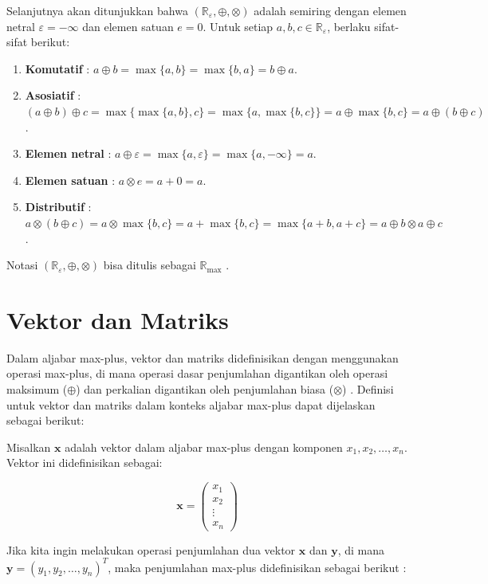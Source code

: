 \documentclass{file/TA-ITS}
\theoremstyle{definition}
\theoremstyle{definition}
\theoremstyle{plain}
\newcommand{\Real}{\mathbb{R}}
\begin{document}
Selanjutnya akan ditunjukkan bahwa $\left(\Real_\varepsilon,\oplus,\otimes\right)$ adalah semiring dengan elemen netral $\varepsilon=-\infty$ dan elemen satuan $e=0$. Untuk setiap $a,b,c\in\Real_\varepsilon$, berlaku sifat-sifat berikut:
\begin{enumerate}
    \item \textbf{Komutatif} : $a\oplus b=\max\{a,b\}=\max\{b,a\}=b\oplus a$.
    \item \textbf{Asosiatif} : $(a\oplus b)\oplus c=\max\{\max\{a,b\},c\}=\max\{a,\max\{b,c\}\}=a\oplus\max\{b,c\}=a\oplus(b\oplus c)$.
    \item \textbf{Elemen netral} : $a\oplus\varepsilon=\max\{a,\varepsilon\}=\max\{a,-\infty\}=a$.
    \item \textbf{Elemen satuan} : $a\otimes e=a+0=a$.
    \item \textbf{Distributif} : $a\otimes(b\oplus c)=a\otimes\max\{b,c\}=a+\max\{b,c\}=\max\{a+b,a+c\}=a\oplus b\otimes a\oplus c$.
\end{enumerate}
Notasi $\left(\Real_\varepsilon,\oplus,\otimes\right)$ bisa ditulis sebagai $\Real_{\max}$ \cite{subiono2015minmaxplus}.

\section{Vektor dan Matriks}

\indent Dalam aljabar max-plus, vektor dan matriks didefinisikan dengan menggunakan operasi max-plus, di mana operasi dasar penjumlahan digantikan oleh operasi maksimum (\(\oplus\)) dan perkalian digantikan oleh penjumlahan biasa (\(\otimes\)) \cite{butkovic2010maxplus,heidergott,baccelli}. Definisi untuk vektor dan matriks dalam konteks aljabar max-plus dapat dijelaskan sebagai berikut:

Misalkan \( \mathbf{x} \) adalah vektor dalam aljabar max-plus dengan komponen \( x_1, x_2, \dots, x_n \). Vektor ini didefinisikan sebagai:

\[
\mathbf{x} = \begin{pmatrix} x_1 \\ x_2 \\ \vdots \\ x_n \end{pmatrix}
\]

Jika kita ingin melakukan operasi penjumlahan dua vektor \( \mathbf{x} \) dan \( \mathbf{y} \), di mana \( \mathbf{y} = (y_1, y_2, \dots, y_n)^T \), maka penjumlahan max-plus didefinisikan sebagai berikut \cite{cassandras}:
\end{document}
